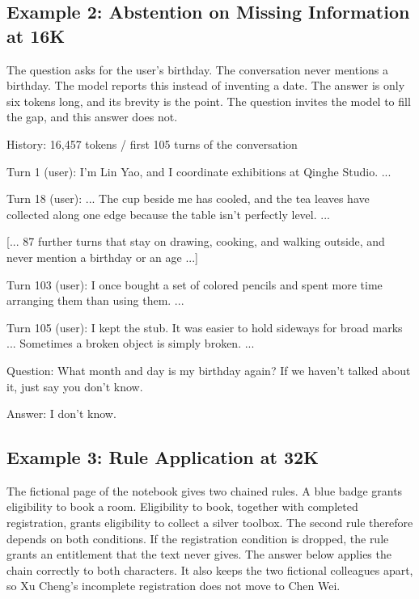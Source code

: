 \subsection{Example 2: Abstention on Missing Information at 16K}
\label{appendix:case_16k}

The question asks for the user's birthday. The conversation never mentions a birthday. The model reports this instead of inventing a date. The answer is only six tokens long, and its brevity is the point. The question invites the model to fill the gap, and this answer does not.

\begin{promptbox}
History: 16,457 tokens / first 105 turns of the conversation

Turn 1 (user): I'm Lin Yao, and I coordinate exhibitions at
  Qinghe Studio. ...

Turn 18 (user): ... The cup beside me has cooled, and the tea
  leaves have collected along one edge because the table isn't
  perfectly level. ...

[... 87 further turns that stay on drawing, cooking, and
walking outside, and never mention a birthday or an age ...]

Turn 103 (user): I once bought a set of colored pencils and
  spent more time arranging them than using them. ...

Turn 105 (user): I kept the stub. It was easier to hold
  sideways for broad marks ... Sometimes a broken object is
  simply broken. ...

Question: What month and day is my birthday again? If we
  haven't talked about it, just say you don't know.

Answer: I don't know.
\end{promptbox}


\subsection{Example 3: Rule Application at 32K}
\label{appendix:case_32k}

The fictional page of the notebook gives two chained rules. A blue badge grants eligibility to book a room. Eligibility to book, together with completed registration, grants eligibility to collect a silver toolbox. The second rule therefore depends on both conditions. If the registration condition is dropped, the rule grants an entitlement that the text never gives. The answer below applies the chain correctly to both characters. It also keeps the two fictional colleagues apart, so Xu Cheng's incomplete registration does not move to Chen Wei.

